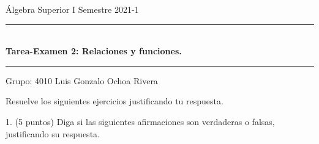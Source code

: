 \documentclass[letterpaper,11pt]{article}
\begin{document}
\setlength{\parindent}{0pt}

Álgebra Superior I \;\;\;\;\;\;\;\;\;\;\;\;\;\;\;\;\;\;\;\;\;\;\;\;\;\;\;\;\;\;\;\;\;\;\;\;\;\;\;\;\;\;\;\;\;\;\;\;\;\;\;\;\;\;\;\;\;\;\;\;\;\;\;\;\;\;\;\;\;\;\;\;\;\;\;\;\;\;\;\;\;\;\;\;\;\;\;\;\;\;\;\;\;\;\;\;\;\;
Semestre 2021-1

  \rule{16.6cm}{0.3pt} %
  \begin{center}
    \LARGE \textbf{\\Tarea-Examen 2: Relaciones y funciones.}
  \end{center}
  \rule{16.6cm}{0.3pt} \newline

  Grupo: 4010 \newline
  Luis Gonzalo Ochoa Rivera \newline \newline

  Resuelve los siguientes ejercicios justificando tu respuesta. \newline

  1. (5 puntos) Diga si las siguientes afirmaciones son verdaderas o falsas, justificando su respuesta. \newline
\end{document}
